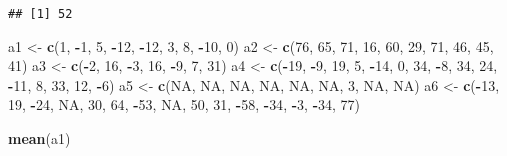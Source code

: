 \documentclass[
]{article}
\newenvironment{Shaded}{\begin{snugshade}}{\end{snugshade}}
\newcommand{\ConstantTok}[1]{\textcolor[rgb]{0.56,0.35,0.01}{#1}}
\newcommand{\DecValTok}[1]{\textcolor[rgb]{0.00,0.00,0.81}{#1}}
\newcommand{\FunctionTok}[1]{\textcolor[rgb]{0.13,0.29,0.53}{\textbf{#1}}}
\newcommand{\NormalTok}[1]{#1}
\newcommand{\OtherTok}[1]{\textcolor[rgb]{0.56,0.35,0.01}{#1}}
\newcommand{\SpecialCharTok}[1]{\textcolor[rgb]{0.81,0.36,0.00}{\textbf{#1}}}
\begin{document}
\begin{verbatim}
## [1] 52
\end{verbatim}

\begin{Shaded}
\begin{Highlighting}[]
\NormalTok{a1 }\OtherTok{\textless{}{-}} \FunctionTok{c}\NormalTok{(}\DecValTok{1}\NormalTok{, }\SpecialCharTok{{-}}\DecValTok{1}\NormalTok{, }\DecValTok{5}\NormalTok{, }\SpecialCharTok{{-}}\DecValTok{12}\NormalTok{, }\SpecialCharTok{{-}}\DecValTok{12}\NormalTok{, }\DecValTok{3}\NormalTok{, }\DecValTok{8}\NormalTok{, }\SpecialCharTok{{-}}\DecValTok{10}\NormalTok{, }\DecValTok{0}\NormalTok{)}
\NormalTok{a2 }\OtherTok{\textless{}{-}} \FunctionTok{c}\NormalTok{(}\DecValTok{76}\NormalTok{, }\DecValTok{65}\NormalTok{, }\DecValTok{71}\NormalTok{, }\DecValTok{16}\NormalTok{, }\DecValTok{60}\NormalTok{, }\DecValTok{29}\NormalTok{, }\DecValTok{71}\NormalTok{, }\DecValTok{46}\NormalTok{, }\DecValTok{45}\NormalTok{, }\DecValTok{41}\NormalTok{)}
\NormalTok{a3 }\OtherTok{\textless{}{-}} \FunctionTok{c}\NormalTok{(}\SpecialCharTok{{-}}\DecValTok{2}\NormalTok{, }\DecValTok{16}\NormalTok{, }\SpecialCharTok{{-}}\DecValTok{3}\NormalTok{, }\DecValTok{16}\NormalTok{, }\SpecialCharTok{{-}}\DecValTok{9}\NormalTok{, }\DecValTok{7}\NormalTok{, }\DecValTok{31}\NormalTok{)}
\NormalTok{a4 }\OtherTok{\textless{}{-}} \FunctionTok{c}\NormalTok{(}\SpecialCharTok{{-}}\DecValTok{19}\NormalTok{, }\SpecialCharTok{{-}}\DecValTok{9}\NormalTok{, }\DecValTok{19}\NormalTok{, }\DecValTok{5}\NormalTok{, }\SpecialCharTok{{-}}\DecValTok{14}\NormalTok{, }\DecValTok{0}\NormalTok{, }\DecValTok{34}\NormalTok{, }\SpecialCharTok{{-}}\DecValTok{8}\NormalTok{, }\DecValTok{34}\NormalTok{, }\DecValTok{24}\NormalTok{, }\SpecialCharTok{{-}}\DecValTok{11}\NormalTok{, }\DecValTok{8}\NormalTok{, }\DecValTok{33}\NormalTok{, }\DecValTok{12}\NormalTok{, }\SpecialCharTok{{-}}\DecValTok{6}\NormalTok{)}
\NormalTok{a5 }\OtherTok{\textless{}{-}} \FunctionTok{c}\NormalTok{(}\ConstantTok{NA}\NormalTok{, }\ConstantTok{NA}\NormalTok{, }\ConstantTok{NA}\NormalTok{, }\ConstantTok{NA}\NormalTok{, }\ConstantTok{NA}\NormalTok{, }\ConstantTok{NA}\NormalTok{, }\DecValTok{3}\NormalTok{, }\ConstantTok{NA}\NormalTok{, }\ConstantTok{NA}\NormalTok{)}
\NormalTok{a6 }\OtherTok{\textless{}{-}} \FunctionTok{c}\NormalTok{(}\SpecialCharTok{{-}}\DecValTok{13}\NormalTok{, }\DecValTok{19}\NormalTok{, }\SpecialCharTok{{-}}\DecValTok{24}\NormalTok{, }\ConstantTok{NA}\NormalTok{, }\DecValTok{30}\NormalTok{, }\DecValTok{64}\NormalTok{, }\SpecialCharTok{{-}}\DecValTok{53}\NormalTok{, }\ConstantTok{NA}\NormalTok{, }\DecValTok{50}\NormalTok{, }\DecValTok{31}\NormalTok{, }\SpecialCharTok{{-}}\DecValTok{58}\NormalTok{, }\SpecialCharTok{{-}}\DecValTok{34}\NormalTok{, }\SpecialCharTok{{-}}\DecValTok{3}\NormalTok{, }\SpecialCharTok{{-}}\DecValTok{34}\NormalTok{, }\DecValTok{77}\NormalTok{)}

\FunctionTok{mean}\NormalTok{(a1)}
\end{Highlighting}
\end{Shaded}
\end{document}
